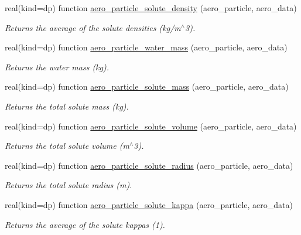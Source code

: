\begin{DoxyCompactItemize}
real(kind=dp) function \mbox{\hyperlink{namespacepmc__aero__particle_a10b8893d9fe31aaf0de1f98f22003c71}{aero\+\_\+particle\+\_\+solute\+\_\+density}} (aero\+\_\+particle, aero\+\_\+data)
\begin{DoxyCompactList}\small\item\em Returns the average of the solute densities (kg/m$^\wedge$3). \end{DoxyCompactList}\item 
real(kind=dp) function \mbox{\hyperlink{namespacepmc__aero__particle_a90baff859a7a0ee039750d2f7db6f9e5}{aero\+\_\+particle\+\_\+water\+\_\+mass}} (aero\+\_\+particle, aero\+\_\+data)
\begin{DoxyCompactList}\small\item\em Returns the water mass (kg). \end{DoxyCompactList}\item 
real(kind=dp) function \mbox{\hyperlink{namespacepmc__aero__particle_a6093b9c44631f9634430d8ced41985b1}{aero\+\_\+particle\+\_\+solute\+\_\+mass}} (aero\+\_\+particle, aero\+\_\+data)
\begin{DoxyCompactList}\small\item\em Returns the total solute mass (kg). \end{DoxyCompactList}\item 
real(kind=dp) function \mbox{\hyperlink{namespacepmc__aero__particle_ae33468d919702d9e8cc26940cb804fcf}{aero\+\_\+particle\+\_\+solute\+\_\+volume}} (aero\+\_\+particle, aero\+\_\+data)
\begin{DoxyCompactList}\small\item\em Returns the total solute volume (m$^\wedge$3). \end{DoxyCompactList}\item 
real(kind=dp) function \mbox{\hyperlink{namespacepmc__aero__particle_a3425f53323717a7efd796a2924c848cd}{aero\+\_\+particle\+\_\+solute\+\_\+radius}} (aero\+\_\+particle, aero\+\_\+data)
\begin{DoxyCompactList}\small\item\em Returns the total solute radius (m). \end{DoxyCompactList}\item 
real(kind=dp) function \mbox{\hyperlink{namespacepmc__aero__particle_a913bc45d353b6e7bca19cbdaad951b52}{aero\+\_\+particle\+\_\+solute\+\_\+kappa}} (aero\+\_\+particle, aero\+\_\+data)
\begin{DoxyCompactList}\small\item\em Returns the average of the solute kappas (1). \end{DoxyCompactList}\item 

\end{DoxyCompactItemize}
